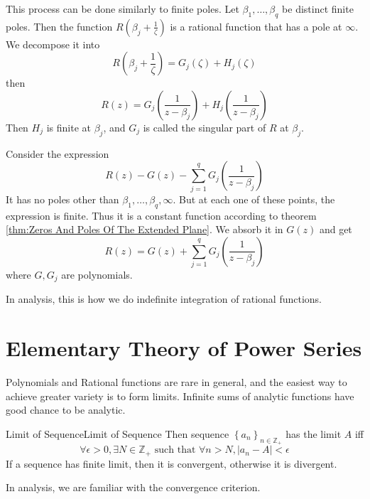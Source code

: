 \documentclass[../main.tex]{subfiles}
\begin{document}
This process can be done similarly to finite poles. Let $\beta_1, \ldots ,\beta_q$ be distinct finite poles. Then the function $\displaystyle R(\beta_j + \frac{1}{\zeta})$ is a rational function that has a pole at $\infty $. We decompose it into
\begin{equation*}
	R(\beta_j + \frac{1}{\zeta}) = G_j(\zeta) + H_j(\zeta)
\end{equation*}
then
\begin{equation*}
	R(z) =G_j (\frac{1}{z-\beta_j}) + H_j(\frac{1}{z-\beta_j})
\end{equation*}
Then $H_j$ is finite at $\beta_j$, and $G_j$ is called the singular part of $R$ at $\beta_j$.

Consider the expression
\begin{equation*}
	R(z) - G(z) - \sum_{j=1}^{q} G_j(\frac{1}{z-\beta_j})
\end{equation*}
It has no poles other than $\beta_1, \ldots ,\beta_q,\infty $. But at each one of these points, the expression is finite. Thus it is a constant function according to theorem \ref{thm:Zeros And Poles Of The Extended Plane}. We absorb it in $G(z)$ and get
\begin{equation}
	R(z) = G(z) + \sum_{j=1}^{q} G_j(\frac{1}{z-\beta_j})
\end{equation}
where $G,G_j$ are polynomials.

In analysis, this is how we do indefinite integration of rational functions.

\section{Elementary Theory of Power Series}

Polynomials and Rational functions are rare in general, and the easiest way to achieve greater variety is to form limits. Infinite sums of analytic functions have good chance to be analytic.

\begin{definition}{Limit of Sequence}{Limit of Sequence}
Then sequence $\left\{ a_n \right\}_{n\in \mathbb{Z}_+}$ has the limit $A$ iff
\begin{equation*}
	\forall \epsilon>0, \exists N\in \mathbb{Z}_+ \text{ such that } \forall n>N, \left|a_n-A\right|<\epsilon
\end{equation*}
If a sequence has finite limit, then it is convergent, otherwise it is divergent.
\end{definition}

In analysis, we are familiar with the convergence criterion.
\end{document}
